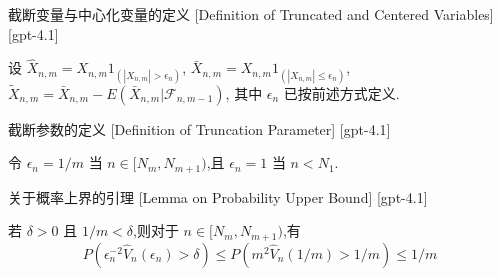 \documentclass[UTF8]{ctexart}
\begin{document}
    \begin{dfn}
        {截断变量与中心化变量的定义}
        [Definition of Truncated and Centered Variables]
        [gpt-4.1]
        
设
$\hat { X } _ { n , m } = X _ { n , m } 1 _ { ( | X _ { n , m } | > \epsilon _ { n } ) }$,
$\bar { X } _ { n , m } = X _ { n , m } 1 _ { ( | X _ { n , m } | \leq \epsilon _ { n } ) }$,
$\tilde { X } _ { n , m } = \bar { X } _ { n , m } - E ( \bar { X } _ { n , m } | \mathcal { F } _ { n , m - 1 } )$,
其中 $\epsilon_n$ 已按前述方式定义.

    \end{dfn}
    
    
    
    \begin{dfn}
        {截断参数的定义}
        [Definition of Truncation Parameter]
        [gpt-4.1]
        
令 $\epsilon _ { n } = 1 / m$ 当 $n \in [ N _ { m } , N _ { m + 1 } )$,且 $\epsilon _ { n } = 1$ 当 $n < N _ { 1 }$.

    \end{dfn}
    
    
    
    \begin{lma}
        {关于概率上界的引理}
        [Lemma on Probability Upper Bound]
        [gpt-4.1]
        
若 $\delta > 0$ 且 $1 / m < \delta$,则对于 $n \in [ N _ { m } , N _ { m + 1 } )$,有
\[
P ( \epsilon _ { n } ^ { - 2 } \hat { V } _ { n } ( \epsilon _ { n } ) > \delta ) \leq P ( m ^ { 2 } \hat { V } _ { n } ( 1 / m ) > 1 / m ) \leq 1 / m
\]

    \end{lma}
    
    
    
\end{document}
